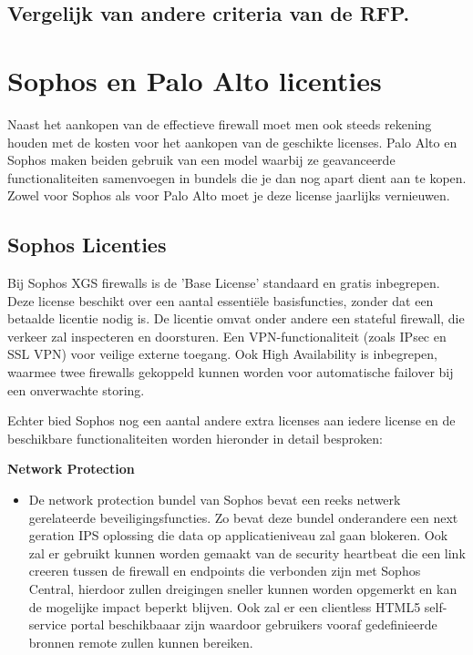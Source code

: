 \subsection{Vergelijk van andere criteria van de RFP.}



\section{Sophos en Palo Alto licenties}
Naast het aankopen van de effectieve firewall moet men ook steeds rekening houden met de kosten voor het aankopen van de geschikte licenses. Palo Alto en Sophos maken beiden gebruik van een model waarbij ze
geavanceerde functionaliteiten samenvoegen in bundels die je dan nog apart dient aan te kopen. Zowel voor Sophos als voor Palo Alto moet je deze license jaarlijks vernieuwen.


\subsection{Sophos Licenties}
Bij Sophos XGS firewalls is de 'Base License' standaard en gratis inbegrepen. Deze license beschikt over een aantal essentiële basisfuncties, zonder dat een betaalde licentie nodig is. De licentie omvat onder andere een stateful firewall, die verkeer zal inspecteren en doorsturen. Een VPN-functionaliteit (zoals IPsec en SSL VPN) voor veilige externe toegang. Ook High Availability is inbegrepen, waarmee twee firewalls gekoppeld kunnen worden voor automatische failover bij een onverwachte storing.

\vspace{5mm}
Echter bied Sophos nog een aantal andere extra licenses aan iedere license en de beschikbare functionaliteiten worden hieronder in detail besproken:

\textbf{Network Protection}
\begin{itemize}[label=\textbullet]
    \item De network protection bundel van Sophos bevat een reeks netwerk gerelateerde beveiligingsfuncties. Zo bevat deze bundel onderandere een next geration IPS oplossing die data op applicatieniveau zal gaan blokeren. Ook zal er gebruikt kunnen worden gemaakt van de security heartbeat die een link creeren tussen de firewall en endpoints die verbonden zijn met Sophos Central, hierdoor zullen dreigingen sneller kunnen worden opgemerkt en kan de mogelijke impact beperkt blijven. Ook zal er een clientless HTML5 self-service portal beschikbaaar zijn waardoor gebruikers vooraf gedefinieerde bronnen remote zullen kunnen bereiken.
\end{itemize}

